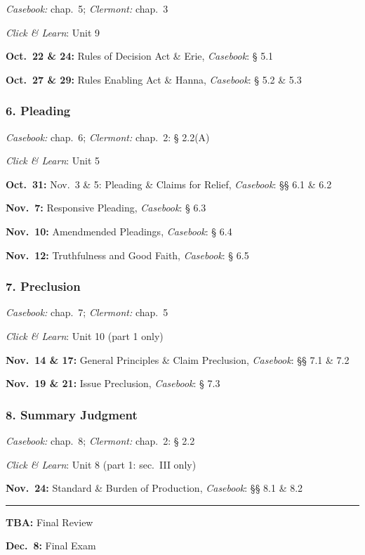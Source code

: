\documentclass[11pt,letterpaper,twoside]{article}
\begin{document}
\emph{Casebook:} chap.~5; \emph{Clermont:} chap.~3

\emph{Click \& Learn}: Unit 9

\textbf{Oct.~22 \& 24:} Rules of Decision Act \& Erie, \emph{Casebook}:
§ 5.1

\textbf{Oct.~27 \& 29:} Rules Enabling Act \& Hanna, \emph{Casebook}: §
5.2 \& 5.3

\subsubsection{6. Pleading}\label{pleading}

\emph{Casebook:} chap.~6; \emph{Clermont:} chap.~2: § 2.2(A)

\emph{Click \& Learn}: Unit 5

\textbf{Oct.~31:} Nov.~3 \& 5: Pleading \& Claims for Relief,
\emph{Casebook}: §§ 6.1 \& 6.2

\textbf{Nov.~7:} Responsive Pleading, \emph{Casebook}: § 6.3

\textbf{Nov.~10:} Amendmended Pleadings, \emph{Casebook}: § 6.4

\textbf{Nov.~12:} Truthfulness and Good Faith, \emph{Casebook}: § 6.5

\subsubsection{7. Preclusion}\label{preclusion}

\emph{Casebook:} chap.~7; \emph{Clermont:} chap.~5

\emph{Click \& Learn}: Unit 10 (part 1 only)

\textbf{Nov.~14 \& 17:} General Principles \& Claim Preclusion,
\emph{Casebook}: §§ 7.1 \& 7.2

\textbf{Nov.~19 \& 21:} Issue Preclusion, \emph{Casebook}: § 7.3

\subsubsection{8. Summary Judgment}\label{summary-judgment}

\emph{Casebook:} chap.~8; \emph{Clermont:} chap.~2: § 2.2

\emph{Click \& Learn}: Unit 8 (part 1: sec.~III only)

\textbf{Nov.~24:} Standard \& Burden of Production, \emph{Casebook}: §§
8.1 \& 8.2

\begin{center}\rule{0.5\linewidth}{0.5pt}\end{center}

\textbf{TBA:} Final Review

\textbf{Dec.~8:} Final Exam
\end{document}
